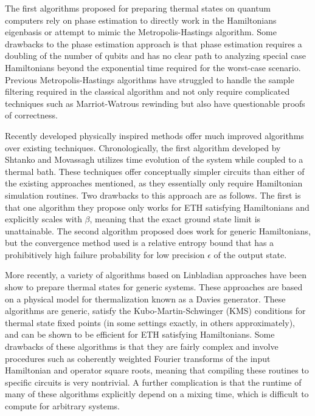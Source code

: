 \documentclass[
11pt,
 amsmath,amssymb,
 aps,
onecolumn, 
nofootinbib]{revtex4-2}
\begin{document}
The first algorithms proposed for preparing thermal states on quantum computers rely on phase estimation to directly work in the Hamiltonians eigenbasis or attempt to mimic the Metropolis-Hastings algorithm. Some drawbacks to the phase estimation approach is that phase estimation requires a doubling of the number of qubits and has no clear path to analyzing special case Hamiltonians beyond the exponential time required for the worst-case scenario. Previous Metropolis-Hastings algorithms have struggled to handle the sample filtering required in the classical algorithm and not only require complicated techniques such as Marriot-Watrous rewinding but also have questionable proofs of correctness.

Recently developed physically inspired methods offer much improved algorithms over existing techniques. Chronologically, the first algorithm developed by Shtanko and Movassagh utilizes time evolution of the system while coupled to a thermal bath. These techniques offer conceptually simpler circuits than either of the existing approaches mentioned, as they essentially only require Hamiltonian simulation routines. Two drawbacks to this approach are as follows. The first is that one algorithm they propose only works for ETH satisfying Hamiltonians and explicitly scales with $\beta$, meaning that the exact ground state limit is unattainable. The second algorithm proposed does work for generic Hamiltonians, but the convergence method used is a relative entropy bound that has a prohibitively high failure probability for low precision $\epsilon$ of the output state.

More recently, a variety of algorithms \cite{chen2023quantumthermalstatepreparation, gilyen2024quantumgeneralizationsglaubermetropolis} based on Linbladian approaches have been show to prepare thermal states for generic systems. These approaches are based on a physical model for thermalization known as a Davies generator. These algorithms are generic, satisfy the Kubo-Martin-Schwinger (KMS) conditions for thermal state fixed points (in some settings exactly, in others approximately), and can be shown to be efficient for ETH satisfying Hamiltonians. Some drawbacks of these algorithms is that they are fairly complex and involve procedures such as coherently weighted Fourier transforms of the input Hamiltonian and operator square roots, meaning that compiling these routines to specific circuits is very nontrivial. A further complication is that the runtime of many of these algorithms explicitly depend on a mixing time, which is difficult to compute for arbitrary systems.
\end{document}
